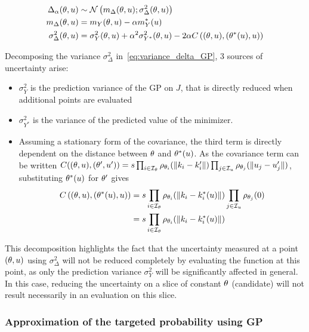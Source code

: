 \documentclass[../../Main_ManuscritThese.tex]{subfiles}
\begin{document}
\begin{align}
  \Delta_{\alpha}(\theta,u) &\sim \mathcal{N}\left(m_{\Delta}(\theta,u); \sigma^2_{\Delta}(\theta,u)\right)  \label{eq:delta_GP}\\
  m_{\Delta}(\theta,u) &= m_Y(\theta,u) - \alpha m_Y^*(u) \label{eq:mu_delta_GP}\\
  \sigma^2_{\Delta}(\theta,u) &= \sigma_Y^2(\theta,u) + \alpha^2 \sigma_{Y^*}^2(\theta,u) - 2\alpha C\left((\theta,u),(\theta^*(u),u)\right) \label{eq:variance_delta_GP}
\end{align}


Decomposing the variance $\sigma^2_{\Delta}$ in~\cref{eq:variance_delta_GP}, 3 sources of uncertainty arise:
\begin{itemize}
\item $\sigma^2_{Y}$ is the prediction variance of the GP on $J$, that is directly reduced when additional points are evaluated
\item $\sigma^2_{Y^*}$ is the variance of the predicted value of the minimizer.
  
\item Assuming a stationary form of the covariance, the third term is directly dependent on the distance between $\theta$ and $\theta^*(u)$. As the covariance term can be written $C((\theta,u), (\theta',u')) = s \prod_{i\in\mathcal{I}_{\theta}}\rho_{\theta_i}(\|k_i - k'_i\|) \prod_{j\in\mathcal{I}_{u}} \rho_{\theta_j}(\|u_j - u'_j\|)$, substituting $\theta^*(u)$ for $\theta^\prime$ gives
\begin{align}
  C\left((\theta,u),(\theta^*(u),u)\right) &= s \prod_{i\in\mathcal{I}_{\theta}}\rho_{\theta_i}(\|k_i - k^*_i(u)\|)\prod_{j\in\mathcal{I}_{u}} \rho_{\theta_j}(0) \\
  &=s \prod_{i\in\mathcal{I}_{\theta}}\rho_{\theta_i}(\|k_i - k^*_i(u)\|)
\end{align}
\end{itemize}
This decomposition highlights the fact that the uncertainty measured at a point $(\theta, u)$ using $\sigma_{\Delta}^2$ will not be reduced completely by evaluating the function at this point, as only the prediction variance $\sigma_Y^2$ will be significantly affected in general. In this case, reducing the uncertainty on a slice of constant $\theta$ (candidate) will not result necessarily in an evaluation on this slice.


\subsubsection{Approximation of the targeted probability using GP}
\end{document}
